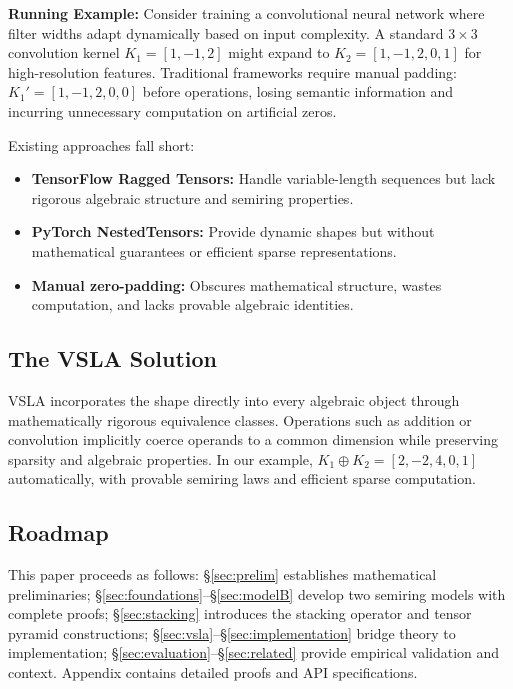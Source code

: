 \documentclass[11pt]{article}
\begin{document}
\textbf{Running Example:} Consider training a convolutional neural network where filter widths adapt dynamically based on input complexity. A standard $3 \times 3$ convolution kernel $K_1 = [1, -1, 2]$ might expand to $K_2 = [1, -1, 2, 0, 1]$ for high-resolution features. Traditional frameworks require manual padding: $K_1' = [1, -1, 2, 0, 0]$ before operations, losing semantic information and incurring unnecessary computation on artificial zeros.

Existing approaches fall short:
\begin{itemize}[leftmargin=1.5em]
\item \textbf{TensorFlow Ragged Tensors:} Handle variable-length sequences but lack rigorous algebraic structure and semiring properties.
\item \textbf{PyTorch NestedTensors:} Provide dynamic shapes but without mathematical guarantees or efficient sparse representations.
\item \textbf{Manual zero-padding:} Obscures mathematical structure, wastes computation, and lacks provable algebraic identities.
\end{itemize}

\subsection{The VSLA Solution}
VSLA incorporates the shape directly into every algebraic object through mathematically rigorous equivalence classes.  Operations such as addition or convolution implicitly coerce operands to a common dimension while preserving sparsity and algebraic properties. In our example, $K_1 \oplus K_2 = [2, -2, 4, 0, 1]$ automatically, with provable semiring laws and efficient sparse computation.

\subsection{Roadmap}
This paper proceeds as follows: §\ref{sec:prelim} establishes mathematical preliminaries; §\ref{sec:foundations}–§\ref{sec:modelB} develop two semiring models with complete proofs; §\ref{sec:stacking} introduces the stacking operator and tensor pyramid constructions; §\ref{sec:vsla}–§\ref{sec:implementation} bridge theory to implementation; §\ref{sec:evaluation}–§\ref{sec:related} provide empirical validation and context. Appendix contains detailed proofs and API specifications.

\clearpage %
\end{document}
